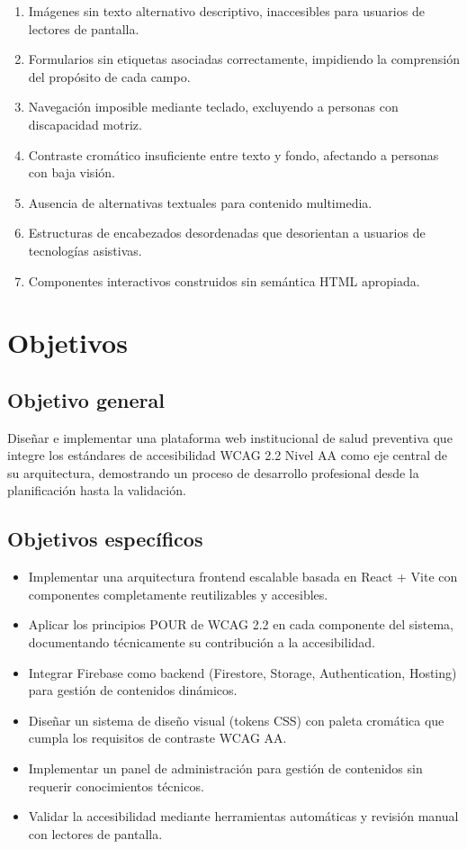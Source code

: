 \documentclass[12pt, a4paper]{report}
\begin{document}
\begin{enumerate}
  \item Imágenes sin texto alternativo descriptivo, inaccesibles para usuarios de lectores de pantalla.
  \item Formularios sin etiquetas asociadas correctamente, impidiendo la comprensión del propósito de cada campo.
  \item Navegación imposible mediante teclado, excluyendo a personas con discapacidad motriz.
  \item Contraste cromático insuficiente entre texto y fondo, afectando a personas con baja visión.
  \item Ausencia de alternativas textuales para contenido multimedia.
  \item Estructuras de encabezados desordenadas que desorientan a usuarios de tecnologías asistivas.
  \item Componentes interactivos construidos sin semántica HTML apropiada.
\end{enumerate}

\section{Objetivos}

\subsection{Objetivo general}

Diseñar e implementar una plataforma web institucional de salud preventiva que integre los estándares de accesibilidad WCAG 2.2 Nivel AA como eje central de su arquitectura, demostrando un proceso de desarrollo profesional desde la planificación hasta la validación.

\subsection{Objetivos específicos}

\begin{itemize}
  \item Implementar una arquitectura frontend escalable basada en React + Vite con componentes completamente reutilizables y accesibles.
  \item Aplicar los principios POUR de WCAG 2.2 en cada componente del sistema, documentando técnicamente su contribución a la accesibilidad.
  \item Integrar Firebase como backend (Firestore, Storage, Authentication, Hosting) para gestión de contenidos dinámicos.
  \item Diseñar un sistema de diseño visual (tokens CSS) con paleta cromática que cumpla los requisitos de contraste WCAG AA.
  \item Implementar un panel de administración para gestión de contenidos sin requerir conocimientos técnicos.
  \item Validar la accesibilidad mediante herramientas automáticas y revisión manual con lectores de pantalla.
\end{itemize}
\end{document}
